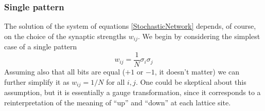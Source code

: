 \subsubsection{Single pattern}
The solution of the system of equations \eqref{StochasticNetwork} depends, of course, on the choice of the synaptic strengths $w_{ij}$. We begin by considering the simplest case of a single pattern
\begin{equation}
w_{ij}=\frac{1}{N}\sigma_i\sigma_j
\end{equation}
Assuming also that all bits are equal ($+1$ or $-1$, it doesn't matter) we can further simplify it as $w_{ij}=1/N$ for all $i, j$. One could be skeptical about this assumption, but it is essentially a gauge transformation, since it corresponds to a reinterpretation of the meaning of ``up'' and ``down'' at each lattice site.

